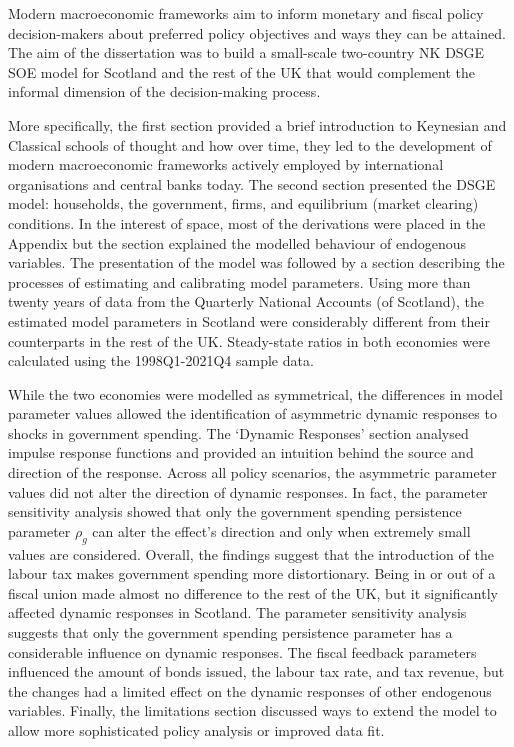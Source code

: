 Modern macroeconomic frameworks aim to inform monetary and fiscal policy decision-makers about preferred policy objectives and ways they can be attained. The aim of the dissertation was to build a small-scale two-country NK DSGE SOE model for Scotland and the rest of the UK that would complement the informal dimension of the decision-making process. 

More specifically, the first section provided a brief introduction to Keynesian and Classical schools of thought and how over time, they led to the development of modern macroeconomic frameworks actively employed by international organisations and central banks today. The second section presented the DSGE model: households, the government, firms, and equilibrium (market clearing) conditions. In the interest of space, most of the derivations were placed in the Appendix but the section explained the modelled behaviour of endogenous variables. The presentation of the model was followed by a section describing the processes of estimating and calibrating model parameters. Using more than twenty years of data from the Quarterly National Accounts (of Scotland), the estimated model parameters in Scotland were considerably different from their counterparts in the rest of the UK. Steady-state ratios in both economies were calculated using the 1998Q1-2021Q4 sample data.

While the two economies were modelled as symmetrical, the differences in model parameter values allowed the identification of asymmetric dynamic responses to shocks in government spending. The `Dynamic Responses' section analysed impulse response functions and provided an intuition behind the source and direction of the response. Across all policy scenarios, the asymmetric parameter values did not alter the direction of dynamic responses. In fact, the parameter sensitivity analysis showed that only the government spending persistence parameter $\rho_g$ can alter the effect's direction and only when extremely small values are considered. Overall, the findings suggest that the introduction of the labour tax makes government spending more distortionary. Being in or out of a fiscal union made almost no difference to the rest of the UK, but it significantly affected dynamic responses in Scotland. The parameter sensitivity analysis suggests that only the government spending persistence parameter has a considerable influence on dynamic responses. The fiscal feedback parameters influenced the amount of bonds issued, the labour tax rate, and tax revenue, but the changes had a limited effect on the dynamic responses of other endogenous variables. Finally, the limitations section discussed ways to extend the model to allow more sophisticated policy analysis or improved data fit.